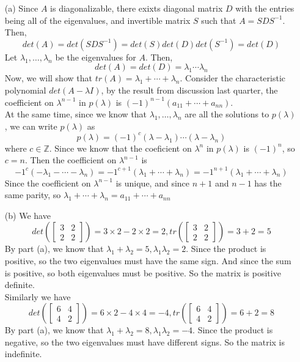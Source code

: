 \documentclass[11pt,letterpaper,cm]{nupset}
\newcommand{\bmat}[1]{\begin{bmatrix} #1 \end{bmatrix}}
\begin{document}
\begin{solution}
	\begin{itemize}
		\item[(a)] Since $A$ is diagonalizable, there exixts diagonal matrix $D$ with the entries being all of the eigenvalues, and invertible matrix $S$ such that $A=SDS^{-1}$. Then,
		$$det(A)=det(SDS^{-1})=det(S)det(D)det(S^{-1})=det(D)$$
		Let $\lambda_1,\ldots,\lambda_n$ be the eigenvalues for $A$. Then,
		$$det(A)=det(D)=\lambda_1\cdots\lambda_n$$
		Now, we will show that $tr(A)=\lambda_1+\cdots+\lambda_n$. Consider the characteristic polynomial $det(A-\lambda I)$, by the result from discussion last quarter, the coefficient on $\lambda^{n-1}$ in $p(\lambda)$ is $(-1)^{n-1}(a_{11}+\cdots+a_{nn})$.\\
		At the same time, since we know that $\lambda_1,\ldots,\lambda_n$ are all the solutions to $p(\lambda)$, we can write $p(\lambda)$ as 
		$$p(\lambda)=(-1)^c(\lambda-\lambda_1)\cdots(\lambda-\lambda_n)$$ where $c\in\mathbb{Z}$. Since we know that the coeficient on $\lambda^n$ in $p(\lambda)$ is $(-1)^n$, so $c=n$.
		Then the coefficient on $\lambda^{n-1}$ is 
		$$-1^{c}(-\lambda_1-\cdots-\lambda_n)=-1^{c+1}(\lambda_1+\cdots+\lambda_n)=-1^{n+1}(\lambda_1+\cdots+\lambda_n)$$
		Since the coefficient on $\lambda^{n-1}$ is unique, and since $n+1$ and $n-1$ has the same parity, so $\lambda_1+\cdots+\lambda_n=a_{11}+\cdots+a_{nn}$
		\item[(b)] We have
		$$det(\bmat{3 & 2\\2 & 2})=3\times2-2\times2=2,tr(\bmat{3 & 2\\2 & 2})=3+2=5$$
		By part (a), we know that $\lambda_1+\lambda_2=5,\lambda_1\lambda_2=2$. Since the product is positive, so the two eigenvalues must have the same sign. And since the sum is positive, so both eigenvalues must be positive. So the matrix is positive definite.\\
		Similarly we have
		$$det(\bmat{6 & 4\\4 & 2})=6\times2-4\times4=-4,tr(\bmat{6 & 4\\4 & 2})=6+2=8$$
		By part (a), we know that $\lambda_1+\lambda_2=8,\lambda_1\lambda_2=-4$. Since the product is negative, so the two eigenvalues must have different signs. So the matrix is indefinite.\\
	\end{itemize}
\end{solution}
\newpage
\end{document}
